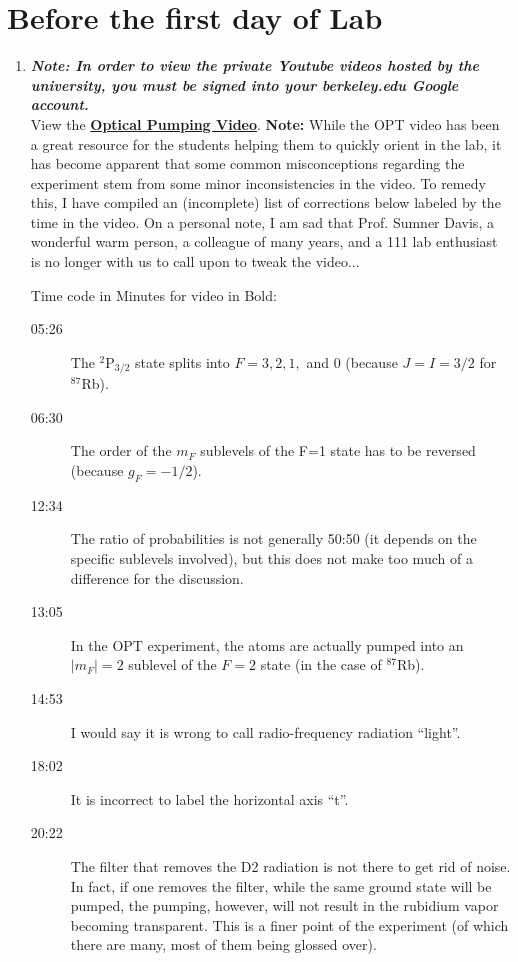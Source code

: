 \documentclass{../lab}
\newcommand{\OpticalPumpingVideo}{https://www.youtube.com/watch?v=v4StxGAhm8Y}
\begin{document}
\section{Before the first day of Lab}
\begin{enumerate}
    \item \emph{\textbf{Note: In order to view the private Youtube videos hosted by the university, you must be signed into your berkeley.edu Google account.}}\\
    View the \href{\OpticalPumpingVideo}{\textbf{Optical Pumping Video}}.
    \textbf{Note:} While the OPT video has been a great resource for the students helping them to quickly orient in the lab, it has become apparent that some common misconceptions regarding the experiment stem from some minor inconsistencies in the video. To remedy this, I have compiled an (incomplete) list of corrections below labeled by the time in the video. On a personal note, I am sad that Prof. Sumner Davis, a wonderful warm person, a colleague of many years, and a 111 lab enthusiast is no longer with us to call upon to tweak the video...

    Time code in Minutes for video in Bold:

    \begin{description}
        \item [05:26] The $^2$P$_{3/2}$ state splits into $F = 3,2,1,$ and 0 (because $J = I = 3/2$ for $^{87}$Rb).

        \item [06:30] The order of the $m_F$ sublevels of the F=1 state has to be reversed (because $g_F = -1/2$).

        \item [12:34] The ratio of probabilities is not generally 50:50 (it depends on the specific sublevels involved), but this does not make too much of a difference for the discussion.

        \item [13:05] In the OPT experiment, the atoms are actually pumped into an $|m_F|=2$ sublevel of the $F = 2$ state (in the case of $^{87}$Rb).

        \item [14:53] I would say it is wrong to call radio-frequency radiation ``light''.

        \item [18:02] It is incorrect to label the horizontal axis ``t''.

        \item [20:22] The filter that removes the D2 radiation is not there to get rid of noise. In fact, if one removes the filter, while the same ground state will be pumped, the pumping, however, will not result in the rubidium vapor becoming transparent. This is a finer point of the experiment (of which there are many, most of them being glossed over).
    \end{description}


\end{enumerate}
\end{document}

